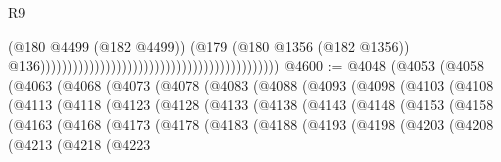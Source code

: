 \begin{lexlean}{R9}
\begin{coremodule}
{{{{{{{{{{{{{{{{{{{{{{{{{{{{{{{{{{{{{{{{{{{{{{{{{{{{{{{{{{{{{{{{{{{{{{{{{{{{{{{{{{{{                                                                                          (@180
                                                                                            @4499
                                                                                            (@182
                                                                                              @4499))
                                                                                          (@179
                                                                                            (@180
                                                                                              @1356
                                                                                              (@182
                                                                                                @1356))
                                                                                            @136))))))))))))))))))))))))))))))))))))))))))))
@4600 := @4048
    (@4053
      (@4058
        (@4063
          (@4068
            (@4073
              (@4078
                (@4083
                  (@4088
                    (@4093
                      (@4098
                        (@4103
                          (@4108
                            (@4113
                              (@4118
                                (@4123
                                  (@4128
                                    (@4133
                                      (@4138
                                        (@4143
                                          (@4148
                                            (@4153
                                              (@4158
                                                (@4163
                                                  (@4168
                                                    (@4173
                                                      (@4178
                                                        (@4183
                                                          (@4188
                                                            (@4193
                                                              (@4198
                                                                (@4203
                                                                  (@4208
                                                                    (@4213
                                                                      (@4218
                                                                        (@4223
}}}}}}}}}}}}}}}}}}}}}}}}}}}}}}}}}}}}}}}}}}}}}}}}}}}}}}}}}}}}}}}}}}}}}}}}}}}}}}}}}}}}
\end{coremodule}
\end{lexlean}
